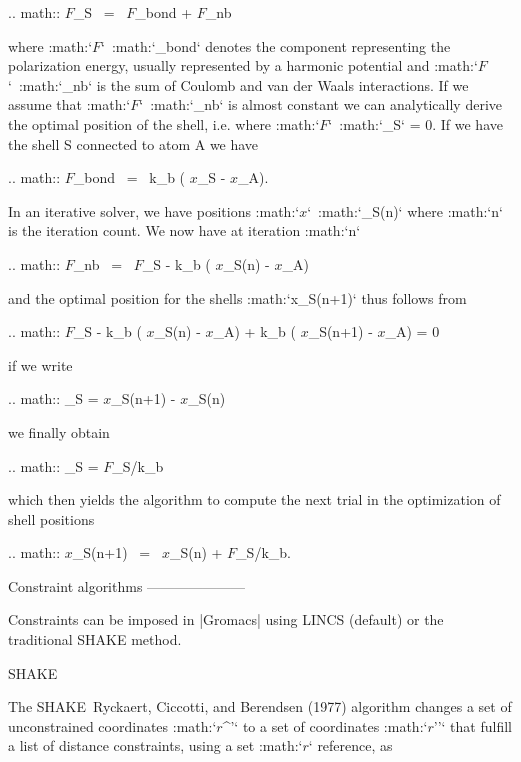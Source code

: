 {.. math:: {\mbox{\boldmath ${F}$}}_S ~=~ {\mbox{\boldmath ${F}$}}_{bond} + {\mbox{\boldmath ${F}$}}_{nb}

where 
:math:`{\mbox{\boldmath ${F}$}}`\ :math:`_{bond}` denotes the
component representing the polarization energy, usually represented by a
harmonic potential and
:math:`{\mbox{\boldmath ${F}$}}`\ :math:`_{nb}` is the sum of Coulomb
and van der Waals interactions. If we assume that
:math:`{\mbox{\boldmath ${F}$}}`\ :math:`_{nb}` is almost constant we
can analytically derive the optimal position of the shell, i.e. where
:math:`{\mbox{\boldmath ${F}$}}`\ :math:`_S` = 0. If we have the
shell S connected to atom A we have

.. math:: {\mbox{\boldmath ${F}$}}_{bond} ~=~ k_b \left( {\mbox{\boldmath ${x}$}}_S - {\mbox{\boldmath ${x}$}}_A\right).

In an iterative solver, we have positions
:math:`{\mbox{\boldmath ${x}$}}`\ :math:`_S(n)` where :math:`n` is
the iteration count. We now have at iteration :math:`n`

.. math:: {\mbox{\boldmath ${F}$}}_{nb} ~=~ {\mbox{\boldmath ${F}$}}_S - k_b \left( {\mbox{\boldmath ${x}$}}_S(n) - {\mbox{\boldmath ${x}$}}_A\right)

and the optimal position for the shells :math:`x_S(n+1)` thus follows
from

.. math:: {\mbox{\boldmath ${F}$}}_S - k_b \left( {\mbox{\boldmath ${x}$}}_S(n) - {\mbox{\boldmath ${x}$}}_A\right) + k_b \left( {\mbox{\boldmath ${x}$}}_S(n+1) - {\mbox{\boldmath ${x}$}}_A\right) = 0

if we write

.. math:: _S = {\mbox{\boldmath ${x}$}}_S(n+1) - {\mbox{\boldmath ${x}$}}_S(n)

we finally obtain

.. math:: _S = {\mbox{\boldmath ${F}$}}_S/k_b

which then yields the algorithm to compute the next trial in the
optimization of shell positions

.. math:: {\mbox{\boldmath ${x}$}}_S(n+1) ~=~ {\mbox{\boldmath ${x}$}}_S(n) + {\mbox{\boldmath ${F}$}}_S/k_b.

Constraint algorithms
---------------------

Constraints can be imposed in |Gromacs| using LINCS (default) or the
traditional SHAKE method.

SHAKE
~~~~~

The SHAKE Ryckaert, Ciccotti, and Berendsen (1977) algorithm changes a
set of unconstrained coordinates :math:`{\mbox{\boldmath ${r}$}}^{'}` to
a set of coordinates :math:`{\mbox{\boldmath ${r}$}}''` that fulfill a
list of distance constraints, using a set
:math:`{\mbox{\boldmath ${r}$}}` reference, as

}
